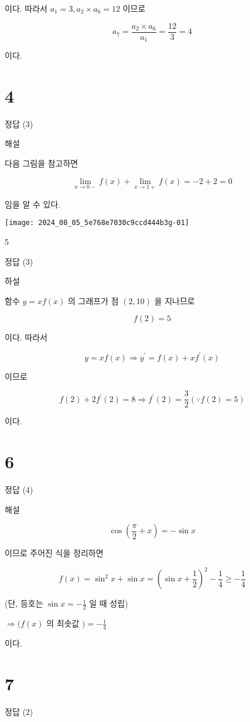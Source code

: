 \documentclass[10pt]{article}
\begin{document}
이다. 따라서 \(a_{1}=3, a_{2} \times a_{6}=12\) 이므로

\[
a_{7}=\frac{a_{2} \times a_{6}}{a_{1}}=\frac{12}{3}=4
\]

이다.

\section*{4}
정답 (3)

해설

다음 그림을 참고하면

\[
\lim _{x \rightarrow 0-} f(x)+\lim _{x \rightarrow 1+} f(x)=-2+2=0
\]

임을 알 수 있다.

\begin{center}
\texttt{[image: 2024\_08\_05\_5e768e7030c9ccd444b3g-01]}
\end{center}

5

정답 (3)

하설

함수 \(y=x f(x)\) 의 그래프가 점 \((2,10)\) 을 지나므로

\[
f(2)=5
\]

이다. 따라서

\[
y=x f(x) \Longrightarrow y^{\prime}=f(x)+x f^{\prime}(x)
\]

이므로

\[
f(2)+2 f^{\prime}(2)=8 \Rightarrow f^{\prime}(2)=\frac{3}{2}(\because f(2)=5)
\]

이다.

\section*{6}
정답 (4)

해설

\[
\cos \left(\frac{\pi}{2}+x\right)=-\sin x
\]

이므로 주어진 식을 정리하면

\[
f(x)=\sin ^{2} x+\sin x=\left(\sin x+\frac{1}{2}\right)^{2}-\frac{1}{4} \geq-\frac{1}{4}
\]

(단, 등호는 \(\sin x=-\frac{1}{2}\) 일 때 성립)

\(\Rightarrow(f(x)\) 의 최솟값 \()=-\frac{1}{4}\)

이다.

\section*{7}
정답 (2)
\end{document}
